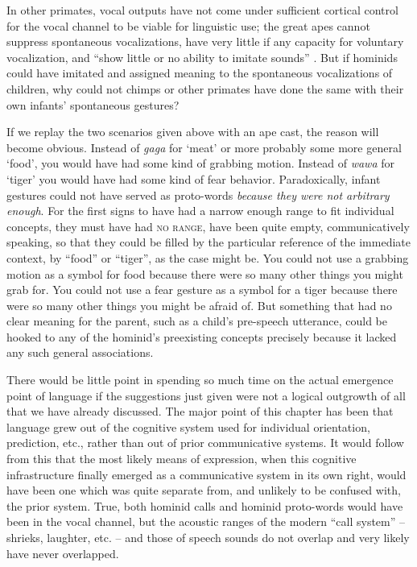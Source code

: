 In other primates, vocal outputs have not come under sufficient cortical control for the vocal channel to be viable for linguistic use; the great apes cannot suppress spontaneous vocalizations, have very little if any capacity for voluntary vocalization, and ``show little or no ability to imitate sounds'' \citep{Dingwall1979}. But if hominids could have imitated and assigned meaning to the spontaneous vocalizations of children, why could not chimps or other primates have done the same with their own infants' spontaneous gestures?


If we replay the two scenarios given above with an ape cast, the reason will become obvious. Instead of \textit{gaga} for `meat' or more probably some more general `food', you would have had some kind of grabbing motion. Instead of \textit{wawa} for `tiger' you would have had some kind of fear behavior. Paradoxically, infant gestures could not have served as proto-words \textit{because they were not arbitrary enough}. For the first signs to have had a narrow enough range to fit individual concepts, they must have had \textsc{no range}, have been quite empty, communicatively speaking, so that they could be filled by the particular reference of the immediate context, by ``food'' or ``tiger'', as the case might be. You could not use a grabbing motion as a symbol for food because there were so many other things you might grab for. You could not use a fear gesture as a symbol for a tiger because there were so many other things you might be afraid of. But something that had no clear meaning for the parent, such as a child's pre-speech utterance, could be hooked to any of the hominid's preexisting concepts precisely because it lacked any such general associations.

There would be little point in spending so much time on the actual emergence point of language if the suggestions just given were not a logical outgrowth of all that we have already discussed. The major point of this chapter has been that language grew out of the cognitive system used for individual orientation, prediction, etc., rather than out of prior communicative systems. It would follow from this that the most likely means of expression, when this cognitive infrastructure finally emerged as a communicative system in its own right, would have been one which was quite separate from, and unlikely to be confused with, the prior system. True, both hominid calls and hominid proto-words would have been in the vocal channel, but the acoustic ranges of the modern ``call system'' -- shrieks, laughter, etc. -- and those of speech sounds do not overlap and very likely have never overlapped.

